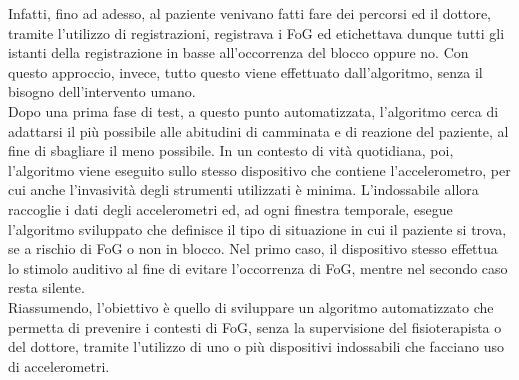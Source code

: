 Infatti, fino ad adesso, al paziente venivano fatti fare dei percorsi ed il dottore, tramite l'utilizzo di registrazioni, registrava i FoG ed etichettava dunque tutti gli istanti della registrazione in basse all'occorrenza del blocco oppure no. Con questo approccio, invece, tutto questo viene effettuato dall'algoritmo, senza il bisogno dell'intervento umano.\\
Dopo una prima fase di test, a questo punto automatizzata, l'algoritmo cerca di adattarsi il più possibile alle abitudini di camminata e di reazione del paziente, al fine di sbagliare il meno possibile. In un contesto di vità quotidiana, poi, l'algoritmo viene eseguito sullo stesso dispositivo che contiene l'accelerometro, per cui anche l'invasività degli strumenti utilizzati è minima. L'indossabile allora raccoglie i dati degli accelerometri ed, ad ogni finestra temporale, esegue l'algoritmo sviluppato che definisce il tipo di situazione in cui il paziente si trova, se a rischio di FoG o non in blocco. Nel primo caso, il dispositivo stesso effettua lo stimolo auditivo al fine di evitare l'occorrenza di FoG, mentre nel secondo caso resta silente.\\
Riassumendo, l'obiettivo è quello di sviluppare un algoritmo automatizzato che permetta di prevenire i contesti di FoG, senza la supervisione del fisioterapista o del dottore, tramite l'utilizzo di uno o più dispositivi indossabili che facciano uso di accelerometri.
